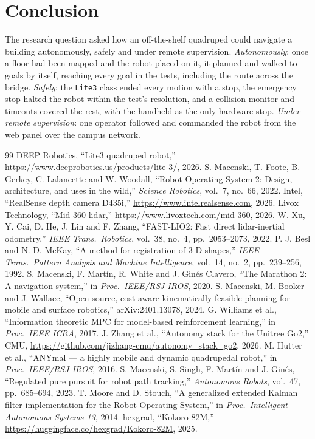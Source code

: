 \documentclass[11pt,a4paper]{article}
\begin{document}
\section{Conclusion}

The research question asked how an off-the-shelf quadruped could navigate a building autonomously,
safely and under remote supervision. \emph{Autonomously}: once a floor had been mapped and the robot
placed on it, it planned and walked to goals by itself, reaching every goal in the tests, including the
route across the bridge. \emph{Safely}: the \texttt{Lite3} class ended every motion with a stop, the
emergency stop halted the robot within the test's resolution, and a collision monitor and timeouts
covered the rest, with the handheld as the only hardware stop. \emph{Under remote supervision}: one operator
followed and commanded the robot from the web panel over the campus network.

{\footnotesize\raggedright
\begin{thebibliography}{99}\setlength{\itemsep}{-1pt}\setlength{\parsep}{0pt}
 DEEP Robotics, ``Lite3 quadruped robot,'' \url{https://www.deeprobotics.us/products/lite-3/}, 2026.
 S. Macenski, T. Foote, B. Gerkey, C. Lalancette and W. Woodall, ``Robot Operating
  System 2: Design, architecture, and uses in the wild,'' \emph{Science Robotics}, vol.~7, no.~66, 2022.
 Intel, ``RealSense depth camera D435i,'' \url{https://www.intelrealsense.com}, 2026.
 Livox Technology, ``Mid-360 lidar,'' \url{https://www.livoxtech.com/mid-360}, 2026.
 W. Xu, Y. Cai, D. He, J. Lin and F. Zhang, ``FAST-LIO2: Fast direct lidar-inertial
  odometry,'' \emph{IEEE Trans.\ Robotics}, vol.~38, no.~4, pp.~2053--2073, 2022.
 P. J. Besl and N. D. McKay, ``A method for registration of 3-D shapes,'' \emph{IEEE
  Trans.\ Pattern Analysis and Machine Intelligence}, vol.~14, no.~2, pp.~239--256, 1992.
 S. Macenski, F. Martín, R. White and J. Ginés Clavero, ``The Marathon 2: A navigation
  system,'' in \emph{Proc.\ IEEE/RSJ IROS}, 2020.
 S. Macenski, M. Booker and J. Wallace, ``Open-source, cost-aware kinematically feasible
  planning for mobile and surface robotics,'' arXiv:2401.13078, 2024.
 G. Williams et al., ``Information theoretic MPC for model-based reinforcement
  learning,'' in \emph{Proc.\ IEEE ICRA}, 2017.
 J. Zhang et al., ``Autonomy stack for the Unitree Go2,'' CMU, \url{https://github.com/jizhang-cmu/autonomy_stack_go2}, 2026.
 M. Hutter et al., ``ANYmal --- a highly mobile and dynamic quadrupedal robot,'' in
  \emph{Proc.\ IEEE/RSJ IROS}, 2016.
 S. Macenski, S. Singh, F. Martín and J. Ginés, ``Regulated pure pursuit for robot path
  tracking,'' \emph{Autonomous Robots}, vol.~47, pp.~685--694, 2023.
 T. Moore and D. Stouch, ``A generalized extended Kalman filter implementation for
  the Robot Operating System,'' in \emph{Proc.\ Intelligent Autonomous Systems 13}, 2014.
 hexgrad, ``Kokoro-82M,'' \url{https://huggingface.co/hexgrad/Kokoro-82M}, 2025.
\end{thebibliography}
}
\end{document}
